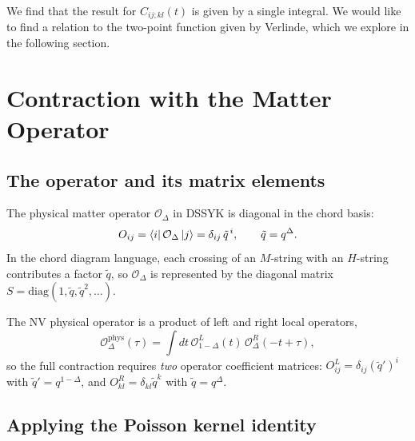 \documentclass[12pt]{scrarticle}
\newcommand{\phys}{\mathrm{phys}}
\begin{document}
We find that the result for $C_{ij;kl}(t)$ is given by a single integral. We would like to find a relation to the two-point function given by Verlinde, which we explore in the following section.


\section{Contraction with the Matter Operator}

\subsection{The operator and its matrix elements}

The physical matter operator $\mathcal{O}_\Delta$ in DSSYK is diagonal in the chord basis:
\begin{equation}
    O_{ij} = \bra{i}\mathcal{O}_\Delta\ket{j} = \delta_{ij}\,\tilde{q}^{\,i},
    \qquad \tilde{q} = q^\Delta.
    \label{eq:operator}
\end{equation}
In the chord diagram language, each crossing of an $M$-string with an $H$-string
contributes a factor $\tilde{q}$, so $\mathcal{O}_\Delta$ is represented by the
diagonal matrix $S = \mathrm{diag}(1,\tilde{q},\tilde{q}^2,\ldots)$.

The NV physical operator is a product of left and right local operators,
\begin{equation}
    \mathcal{O}^\phys_\Delta(\tau) = \int dt\,\mathcal{O}^L_{1-\Delta}(t)\,\mathcal{O}^R_\Delta(-t+\tau),
\end{equation}
so the full contraction requires \emph{two} operator coefficient matrices:
$O^L_{ij} = \delta_{ij}(\tilde{q}')^i$ with $\tilde{q}' = q^{1-\Delta}$, and
$O^R_{kl} = \delta_{kl}\tilde{q}^k$ with $\tilde{q} = q^\Delta$.

\subsection{Applying the Poisson kernel identity}
\end{document}
